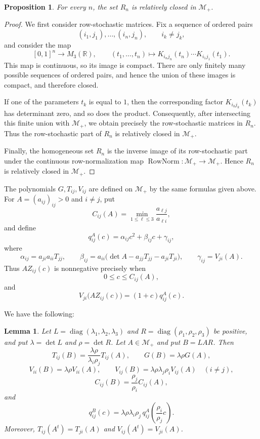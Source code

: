 \documentclass[11pt,onecolumn]{amsart}
\theoremstyle{plain}
\newtheorem{proposition}[theorem]{Proposition}
\newtheorem{lemma}[theorem]{Lemma}
\theoremstyle{definition}
\theoremstyle{remark}
\newcommand{\RowNorm}{\operatorname{RowNorm}}
\begin{document}
\begin{proposition}
\label{prop:Rn-relatively-closed}
For every $n$, the set $R_n$ is relatively closed in $\mathcal M_+$.
\end{proposition}

\begin{proof}
We first consider row-stochastic matrices. Fix a sequence of ordered
pairs
\[
(i_1,j_1),\ldots,(i_n,j_n),
\qquad i_k\neq j_k,
\]
and consider the map
\[
[0,1]^n\longrightarrow M_3(\mathbb R),
\qquad
(t_1,\ldots,t_n)\longmapsto
K_{i_nj_n}(t_n)\cdots K_{i_1j_1}(t_1).
\]
This map is continuous, so its image is compact. There are only
finitely many possible sequences of ordered pairs, and hence the union
of these images is compact, and therefore closed.

If one of the parameters $t_k$ is equal to $1$, then the corresponding
factor $K_{i_kj_k}(t_k)$ has determinant zero, and so does the product.
Consequently, after intersecting this finite union with $\mathcal M_+$,
we obtain precisely the row-stochastic matrices in $R_n$. Thus the
row-stochastic part of $R_n$ is relatively closed in $\mathcal M_+$.

Finally, the homogeneous set $R_n$ is the inverse image of its
row-stochastic part under the continuous row-normalization map
$\RowNorm\colon\mathcal M_+\to\mathcal M_+$. Hence $R_n$ is relatively
closed in $\mathcal M_+$.
\end{proof}


The polynomials $G,T_{ij},V_{ij}$ are defined on $\mathcal M_+$ by the
same formulas given above.  For $A=(a_{ij})_{ij}>0$ and $i\neq j$, put
\[
C_{ij}(A)=\min_{1\leq\ell\leq3}
\frac{a_{\ell j}}{a_{\ell i}},
\]
and define
\[
q_{ij}^A(c)=\alpha_{ij}c^2+\beta_{ij}c+\gamma_{ij},
\]
where
\[
\alpha_{ij}=a_{ji}a_{ii}T_{jj},
\qquad
\beta_{ij}
=a_{ii}\bigl(\det A-a_{jj}T_{jj}-a_{ji}T_{ji}\bigr),
\qquad
\gamma_{ij}=V_{ji}(A).
\]
Thus $AZ_{ij}(c)$ is nonnegative precisely when
\[
0\leq c\leq C_{ij}(A),
\]
and
\[
V_{ji}\bigl(AZ_{ij}(c)\bigr)=(1+c)q_{ij}^A(c).
\]

We have the following:

\begin{lemma}
\label{lem:diagonal-transpose-covariance}
Let $L=\operatorname{diag}(\lambda_1,\lambda_2,\lambda_3)$ and
$R=\operatorname{diag}(\rho_1,\rho_2,\rho_3)$ be positive, and put
$\lambda=\det L$ and $\rho=\det R$. Let $A\in \mathcal M_+$ and put $B=LAR$. Then
\[
T_{ij}(B)=\frac{\lambda\rho}{\lambda_i\rho_j}T_{ij}(A),
\qquad
G(B)=\lambda\rho G(A),
\]
\[
V_{ii}(B)=\lambda\rho V_{ii}(A),
\qquad
V_{ij}(B)=\lambda\rho\lambda_j\rho_iV_{ij}(A)
\quad(i\neq j),
\]
\[
C_{ij}(B)=\frac{\rho_j}{\rho_i}C_{ij}(A),
\]
and
\[
q_{ij}^{B}(c)
=\lambda\rho\lambda_i\rho_j\,
 q_{ij}^A\!\left(\frac{\rho_i}{\rho_j}c\right).
\]
Moreover,
$T_{ij}(A^t)=T_{ji}(A)$ and
$V_{ij}(A^t)=V_{ji}(A)$.
\end{lemma}
\end{document}
